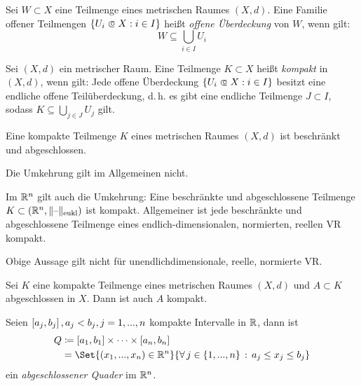 \documentclass{cheat-sheet}
\begin{document}
\begin{defn}
  Sei $W \subset X$ eine Teilmenge eines metrischen Raumes $(X, d)$. Eine Familie offener Teilmengen $\{ U_i \opn X : i \in I \}$ heißt \emph{offene Überdeckung} von $W$, wenn gilt:
  \[ W \subseteq \bigcup_{i \in I} U_i \]
\end{defn}

\begin{defn}
  Sei $(X, d)$ ein metrischer Raum. Eine Teilmenge $K \subset X$ heißt \emph{kompakt} in $(X, d)$, wenn gilt: Jede offene Überdeckung $\{ U_i \opn X : i \in I \}$ besitzt eine endliche offene Teilüberdeckung, d.\,h. es gibt eine endliche Teilmenge $J \subset I$, sodass $K \subseteq \bigcup_{j \in J} U_j$ gilt.
\end{defn}


\begin{satz}
  Eine kompakte Teilmenge $K$ eines metrischen Raumes $(X, d)$ ist beschränkt und abgeschlossen.
\end{satz}

\begin{acht}
  Die Umkehrung gilt im Allgemeinen nicht.
\end{acht}

\begin{satz}
  Im $\mathbb{R}^n$ gilt auch die Umkehrung: Eine beschränkte und abgeschlossene Teilmenge $K \subset (\mathbb{R}^n, \lVert\text{--}\rVert_\text{eukl})$ ist kompakt. Allgemeiner ist jede beschränkte und abgeschlossene Teilmenge eines endlich-dimensionalen, normierten, reellen VR kompakt.
\end{satz}

\begin{acht}
  Obige Aussage gilt nicht für unendlichdimensionale, reelle, normierte VR.
\end{acht}


\begin{satz}
  Sei $K$ eine kompakte Teilmenge eines metrischen Raumes $(X, d)$ und $A \subset K$ abgeschlossen in $X$. Dann ist auch $A$ kompakt.
\end{satz}

\begin{defn}
  Seien $\left[ a_j, b_j \right], a_j < b_j, j = 1, ..., n$ kompakte Intervalle in $\mathbb{R}$, dann ist
  \begin{align*}
    Q &\coloneqq \cinterval{a_1}{b_1} \times \cdots \times \cinterval{a_n}{b_n}\\
    &= \Set{ (x_1, ..., x_n) \in \R^n }{ \fa{j \in \{ 1, ..., n \}} a_j \le x_j \le b_j }
  \end{align*}
  ein \emph{abgeschlossener Quader} im $\mathbb{R}^n$.
\end{defn}
\end{document}
